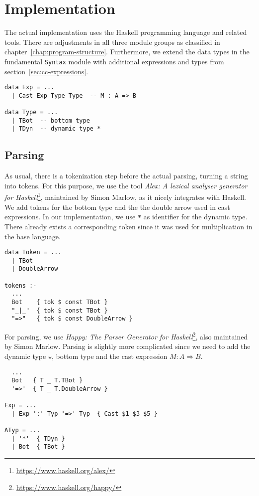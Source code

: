 \chapter{Implementation}\label{chap:implementation}

The actual implementation uses the Haskell programming language and related tools. There are adjustments in all three module groups as classified in chapter~\ref{chap:program-structure}. Furthermore, we extend the data types in the fundamental \texttt{Syntax} module with additional expressions and types from section~\ref{sec:cc-expressions}.

\begin{lstlisting}[caption=Extensions to \texttt{Syntax.hs}]
data Exp = ...
  | Cast Exp Type Type  -- M : A => B

data Type = ...
  | TBot  -- bottom type
  | TDyn  -- dynamic type *
\end{lstlisting}

\section{Parsing}

As usual, there is a tokenization step before the actual parsing, turning a string into tokens. For this purpose, we use the tool \emph{Alex: A lexical analyser generator for Haskell}\footnote{\url{https://www.haskell.org/alex/}}, maintained by Simon Marlow, as it nicely integrates with Haskell. We add tokens for the bottom type and the the double arrow used in cast expressions. In our implementation, we use \texttt{*} as identifier for the dynamic type. There already exists a corresponding token since it was used for multiplication in the base language.

\begin{lstlisting}[float,
  caption=Additional tokens (\texttt{Parsing/Tokens.x})]
data Token = ...
  | TBot
  | DoubleArrow

tokens :-
  ...
  Bot    { tok $ const TBot }
  "_|_"  { tok $ const TBot }
  "=>"   { tok $ const DoubleArrow }
\end{lstlisting}

For parsing, we use \emph{Happy: The Parser Generator for Haskell}\footnote{\url{https://www.haskell.org/happy/}}, also maintained by Simon Marlow. Parsing is slightly more complicated since we need to add the dynamic type $\star$, bottom type and the cast expression $M : A \Rightarrow B$.

\begin{lstlisting}[caption=Extensions to \texttt{Parsing/Grammar.y}]
%token
  ...
  Bot   { T _ T.TBot }
  '=>'  { T _ T.DoubleArrow }

Exp = ...
  | Exp ':' Typ '=>' Typ  { Cast $1 $3 $5 }

ATyp = ...
  | '*'  { TDyn }
  | Bot  { TBot }
\end{lstlisting}

